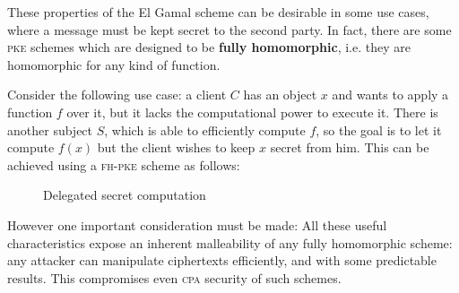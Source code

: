 These properties of the El Gamal scheme can be desirable in some use cases, where a message must be kept secret to the second party. In fact, there are some \textsc{pke} schemes which are designed to be \textbf{fully homomorphic}, i.e. they are homomorphic for any kind of function.

Consider the following use case: a client $C$ has an object $x$ and wants to apply a function $f$ over it, but it lacks the computational power to execute it. There is another subject $S$, which is able to efficiently compute $f$, so the goal is to let it compute $f(x)$ but the client wishes to keep $x$ secret from him. This can be achieved using a \textsc{fh-pke} scheme as follows:


\begin{figure}[h!]
    \centering
    \sdinit{}
    \caption{Delegated secret computation}
    \label{seq:delseccomp}
\end{figure}

However one important consideration must be made: All these useful characteristics expose an inherent malleability of any fully homomorphic scheme: any attacker can manipulate ciphertexts efficiently, and with some predictable results. This compromises even \textsc{cpa} security of such schemes.

